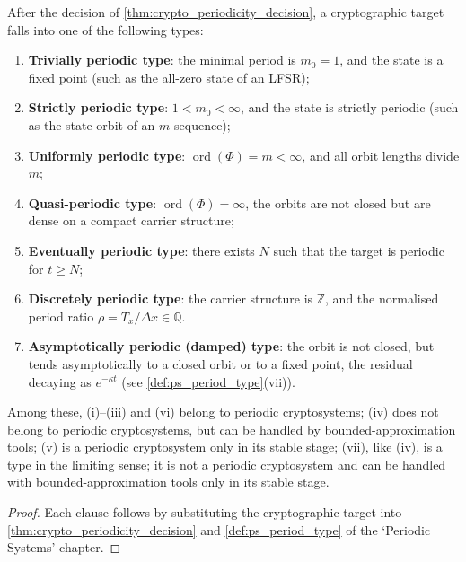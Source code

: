\begin{corollary}\label{cor:crypto_period_type}
After the decision of \cref{thm:crypto_periodicity_decision}, a cryptographic target falls into one of the following types:
\begin{enumerate}[label=(\roman*)]
    \item \textbf{Trivially periodic type}: the minimal period is \(m_0=1\), and the state is a fixed point (such as the all-zero state of an LFSR);
    \item \textbf{Strictly periodic type}: \(1<m_0<\infty\), and the state is strictly periodic (such as the state orbit of an \(m\)-sequence);
    \item \textbf{Uniformly periodic type}: \(\operatorname{ord}(\Phi)=m<\infty\), and all orbit lengths divide \(m\);
    \item \textbf{Quasi-periodic type}: \(\operatorname{ord}(\Phi)=\infty\), the orbits are not closed but are dense on a compact carrier structure;
    \item \textbf{Eventually periodic type}: there exists \(N\) such that the target is periodic for \(t\ge N\);
    \item \textbf{Discretely periodic type}: the carrier structure is \(\mathbb Z\), and the normalised period ratio \(\rho=T_x/\Delta x\in\mathbb Q\).
    \item \textbf{Asymptotically periodic (damped) type}: the orbit is not closed, but tends asymptotically to a closed orbit or to a fixed point, the residual decaying as \(e^{-\kappa t}\) (see \cref{def:ps_period_type}(vii)).
\end{enumerate}
Among these, (i)--(iii) and (vi) belong to periodic cryptosystems; (iv) does not belong to periodic cryptosystems, but can be handled by bounded-approximation tools; (v) is a periodic cryptosystem only in its stable stage; (vii), like (iv), is a type in the limiting sense; it is not a periodic cryptosystem and can be handled with bounded-approximation tools only in its stable stage.
\end{corollary}

\begin{proof}
Each clause follows by substituting the cryptographic target into \cref{thm:crypto_periodicity_decision} and \cref{def:ps_period_type} of the `Periodic Systems' chapter.
\end{proof}

